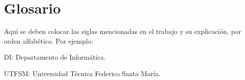 \section*{Glosario}

Aquí se deben colocar las siglas mencionadas en el trabajo y su explicación, por orden alfabético. Por ejemplo: \\

{\setlength{\parskip}{0cm} %
DI: Departamento de Informática.

UTFSM: Universidad Técnica Federico Santa María.
}
